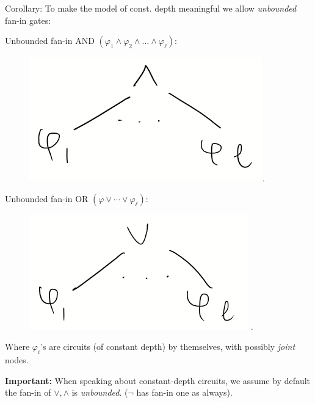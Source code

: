 Corollary: To make the model of const. depth
meaningful we allow \textit{unbounded} fan-in gates:

Unbounded fan-in AND $\left(\varphi_1 \wedge \varphi_2 \wedge \ldots \wedge \varphi_\ell\right)$:
\begin{figure}
    \centering
    \includegraphics[width=0.2\linewidth]{images/AND.png}.
    \label{fig:enter-label}
\end{figure}

Unbounded fan-in OR $\left(\varphi\lor \cdots \lor \varphi_{\ell}\right)$:
\begin{figure}
    \centering
    \includegraphics[width=0.25\linewidth]{images/OR.png}
.
    \label{fig:enter-label}
\end{figure}
Where $\varphi_i$'s are circuits (of constant depth) by themselves, with possibly \emph{joint} nodes. 


\begin{svgraybox}
\textbf{Important:}  When speaking about constant-depth circuits, we assume by default the fan-in of $\lor, \land$ is \emph{unbounded}. ($\neg$ has fan-in one as always).
\end{svgraybox}

